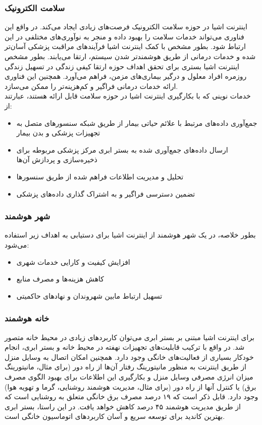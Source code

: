 \subsubsection{سلامت الکترونیک}
اینترنت اشیا در حوزه سلامت الکترونیک فرصت‌های زیادی ایجاد می‌کند. در واقع این فناوری می‌تواند خدمات سلامت را بهبود داده و منجر به نوآوری‌های مختلفی در این ارتباط شود. بطور مشخص با کمک اینترنت اشیا فرآیندهای مراقبت پزشکی آسان‌تر شده و خدمات درمانی از طریق هوشمندتر ‌شدن سیستم، ارتقا می‌یابند. بطور مشخص اینترنت اشیا بستری برای تحقق اهداف حوزه ارتقا کیفی زندگی در تسهیل زندگی روزمره افراد معلول و درگیر بیماری‌های مزمن، فراهم می‌آورد. همچنین این فناوری ارائه خدمات درمانی فراگیر و کم‌هزینه‌تر را ممکن می‌سازد.\\
خدمات نوینی که با بکارگیری اینترنت اشیا در حوزه سلامت قابل ارائه هستند، عبارتند از:
\begin{itemize}
	\item جمع‌آوری داده‌های مرتبط با علائم حیاتی بیمار از طریق شبکه‌ سنسورهای متصل به تجهیزات پزشکی و بدن بیمار
	\item ارسال داده‌های جمع‌آوری شده به بستر ابری مرکز پزشکی مربوطه برای ذخیره‌سازی و پردازش آن‌ها
	\item تحلیل و مدیریت اطلاعات فراهم ‌شده از طریق سنسورها
	\item تضمین دسترسی فراگیر و به اشتراک ‌گذاری داده‌های پزشکی
\end{itemize}
\subsubsection{شهر هوشمند}
بطور خلاصه، در یک شهر هوشمند از اینترنت اشیا برای دستیابی به اهداف زیر استفاده می‌شود:
\begin{itemize}
	\item افزایش کیفیت و کارایی خدمات شهری
	\item کاهش هزینه‌ها و مصرف منابع
	\item تسهیل ارتباط مابین شهروندان و نهادهای حاکمیتی
\end{itemize}
\subsubsection{خانه هوشمند}
برای اینترنت اشیا مبتنی بر بستر ابری می‌توان کاربردهای زیادی در محیط‌ خانه متصور شد. در واقع با ترکیب قابلیت‌های تجهیزات نهفته در محیط خانه و بستر ابری، انجام خودکار بسیاری از فعالیت‌های خانگی وجود دارد. همچنین امکان اتصال به وسایل منزل از طریق اینترنت به منظور مانیتورینگ رفتار آن‌ها از راه دور (برای مثال، مانیتورینگ میزان انرژی مصرفی وسایل منزل و بکارگیری این اطلاعات برای بهبود الگوی مصرف برق) یا کنترل آنها از راه دور (برای مثال، مدیریت هوشمند روشنایی، گرما و تهویه هوا) وجود دارد. قابل ذکر است که ۱۹ درصد مصرف برق خانگی متعلق به روشنایی است که از طریق مدیریت هوشمند ۴۵ درصد کاهش خواهد یافت. در این راستا، بستر ابری بهترین کاندید برای توسعه سریع و آسان کاربردهای اتوماسیون خانگی است.


